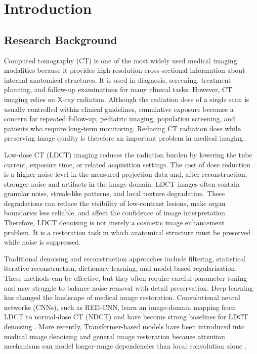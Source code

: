 \chapter{Introduction}

\section{Research Background}

Computed tomography (CT) is one of the most widely used medical imaging modalities because it provides high-resolution cross-sectional information about internal anatomical structures. It is used in diagnosis, screening, treatment planning, and follow-up examinations for many clinical tasks. However, CT imaging relies on X-ray radiation. Although the radiation dose of a single scan is usually controlled within clinical guidelines, cumulative exposure becomes a concern for repeated follow-up, pediatric imaging, population screening, and patients who require long-term monitoring. Reducing CT radiation dose while preserving image quality is therefore an important problem in medical imaging.

Low-dose CT (LDCT) imaging reduces the radiation burden by lowering the tube current, exposure time, or related acquisition settings. The cost of dose reduction is a higher noise level in the measured projection data and, after reconstruction, stronger noise and artifacts in the image domain. LDCT images often contain granular noise, streak-like patterns, and local texture degradation. These degradations can reduce the visibility of low-contrast lesions, make organ boundaries less reliable, and affect the confidence of image interpretation. Therefore, LDCT denoising is not merely a cosmetic image enhancement problem. It is a restoration task in which anatomical structure must be preserved while noise is suppressed.

Traditional denoising and reconstruction approaches include filtering, statistical iterative reconstruction, dictionary learning, and model-based regularization. These methods can be effective, but they often require careful parameter tuning and may struggle to balance noise removal with detail preservation. Deep learning has changed the landscape of medical image restoration. Convolutional neural networks (CNNs), such as RED-CNN, learn an image-domain mapping from LDCT to normal-dose CT (NDCT) and have become strong baselines for LDCT denoising \cite{redcnn}. More recently, Transformer-based models have been introduced into medical image denoising and general image restoration because attention mechanisms can model longer-range dependencies than local convolution alone \cite{attention,ctformer,restormer}.

